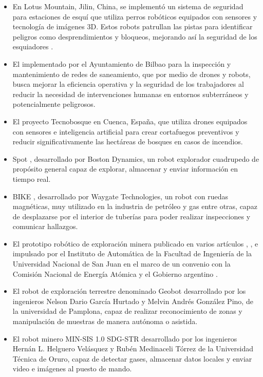 \begin{itemize}
	\item En Lotus Mountain, Jilin, China, se implementó un sistema de seguridad para estaciones de esquí que utiliza perros robóticos equipados con sensores y tecnología de imágenes 3D. Estos robots patrullan las pistas para identificar peligros como desprendimientos y bloqueos, mejorando así la seguridad de los esquiadores \cite{iot_usecase_seg_china}.

	\item El implementado por el Ayuntamiento de Bilbao \cite{iot_usecase_bilbao} para la inspección y mantenimiento de redes de saneamiento, que por medio de drones y robots, busca mejorar la eficiencia operativa y la seguridad de los trabajadores al reducir la necesidad de intervenciones humanas en entornos subterráneos y potencialmente peligrosos.

	\item El proyecto Tecnobosque \cite{iot_usecase_cuenca} en Cuenca, España, que utiliza drones equipados con sensores e inteligencia artificial para crear cortafuegos preventivos y reducir significativamente las hectáreas de bosques en casos de incendios. 


	\item Spot \cite{spot}, desarrollado por Boston Dynamics, un robot explorador cuadrupedo de propósito general capaz de explorar, almacenar y enviar información en tiempo real.
	  
	\item BIKE \cite{bike_inspection}, desarrollado por Waygate Technologies, un robot con ruedas magnéticas, muy utilizado en la industria de petróleo y gas entre otras, capaz de desplazarse por el interior de tuberías para poder realizar inspecciones y comunicar hallazgos.

	\item El prototipo robótico de exploración minera publicado en varios artículos \cite{latam-mining-robot-minero-unsj}, \cite{diario-de-cuyo-prototipo-robotico}, e impulsado por el Instituto de Automática de la Facultad de Ingeniería de la Universidad Nacional de San Juan en el marco de un convenio con la Comisión Nacional de Energía Atómica y el Gobierno argentino \cite{comunicacion-unsj-prototipo-convenio}.

	\item El robot de exploración terrestre denominado Geobot \cite{geobot} desarrollado por los ingenieros Nelson Dario García Hurtado y Melvin Andrés González Pino, de la universidad de Pamplona, capaz de realizar reconocimiento de zonas y manipulación de muestras de manera autónoma o asistida.

	\item El robot minero MIN-SIS 1.0 SDG-STR \cite{min-sis} desarrollado por los ingenieros Hernán L. Helguero Velásquez y Rubén Medinaceli Tórrez de la Universidad Técnica de Oruro, capaz de detectar gases, almacenar datos locales y enviar video e imágenes al puesto de mando.


\end{itemize}


